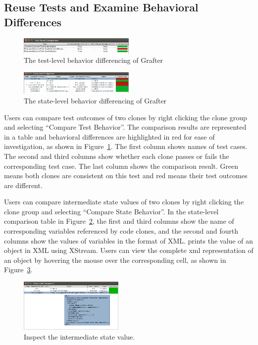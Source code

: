 \subsection{Reuse Tests and Examine Behavioral Differences}

\begin{figure}[!t]
\centering
\includegraphics[width=0.5\textwidth]{grafter-test-diff.png}
\caption{The test-level behavior differencing of Grafter}
\label{fig:test}
\end{figure}

\begin{figure}[!t]
\centering
\includegraphics[width=0.5\textwidth]{grafter-state-diff.png}
\caption{The state-level behavior differencing of Grafter}
\label{fig:state}
\end{figure}

 Users can compare test outcomes of two clones by right clicking the clone group and selecting ``Compare Test Behavior''. The comparison results are represented in a table and behavioral differences are highlighted in red for ease of investigation, as shown in Figure~\ref{fig:test}. The first column shows names of test cases. The second and third columns show whether each clone passes or fails the corresponding test case. The last column shows the comparison result. Green means both clones are consistent on this test and red means their test outcomes are different.

 Users can compare intermediate state values of two clones by right clicking the clone group and selecting ``Compare State Behavior''. In the state-level comparison table in Figure~\ref{fig:state}, the first and third columns show the name of corresponding variables referenced by code clones, and the second and fourth columns show the values of variables in the format of XML. {\grafter} prints the value of an object in XML using XStream. Users can view the complete xml representation of an object by hovering the mouse over the corresponding cell, as shown in Figure~\ref{fig:hover}.

\begin{figure}[!t]
\centering
\includegraphics[width=0.45\textwidth]{hover.png}
\caption{Inspect the intermediate state value.}
\label{fig:hover}
\end{figure}

